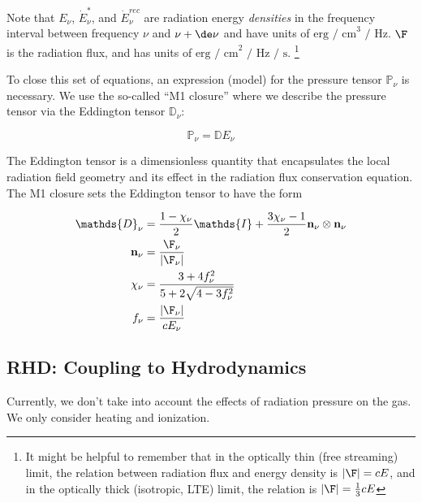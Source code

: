 Note that $E_\nu$, $\dot{E}^*_\nu$, and $\dot{E}^{rec}_\nu$ are radiation energy
\emph{densities} in the frequency interval between frequency $\nu$ and $\nu +
\de \nu$ and have units of $\text{erg / cm}^3 \text{ / Hz}$. 
$\F$ is the radiation flux, and has units of $\text{erg / cm}^2 \text{ / Hz / s}$. 
\footnote{
    It might be helpful to remember that in the optically thin (free streaming)
    limit, the relation between radiation flux and energy density is $|\F| = c
    E$, and in the optically thick (isotropic, LTE) limit, the relation is $|\F|
    = \frac{1}{3}c E$
}


To close this set of equations, an expression (model) for the pressure tensor 
$\mathds{P}_\nu$ is necessary.  We use the so-called ``M1 closure'' where we 
describe the pressure tensor via the Eddington tensor $\mathds{D}_\nu$:


\begin{equation}
	\mathds{P}_\nu = \mathds{D} E_\nu
\end{equation}

The Eddington tensor is a dimensionless quantity that encapsulates the local 
radiation field geometry and its effect in the radiation flux conservation equation.
The M1 closure sets the Eddington tensor to have the form

\begin{align}
	\mathds{D}_\nu &= 
        \frac{1- \chi_\nu}{2} \mathds{I} + \frac{3 \chi_\nu - 1}{2} \mathbf{n}_\nu \otimes \mathbf{n}_\nu \label{eq:eddington-freq} \\
	\mathbf{n}_\nu &= 
        \frac{\F_\nu}{|\F_\nu|} \\
	\chi_\nu &= 
        \frac{3 + 4 f_\nu ^2}{5 + 2 \sqrt{4 - 3 f_\nu^2}} \\
	f_\nu &= 
        \frac{|\F_\nu|}{c E_\nu}
\end{align}









\subsection{RHD: Coupling to Hydrodynamics}

Currently, we don't take into account the effects of radiation pressure on the
gas. We only consider heating and ionization.

